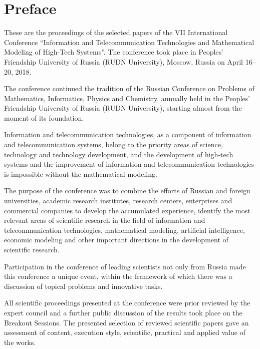 \chapter*{Preface}

These are the proceedings of the selected papers of the VII International
Conference ``Information and
Telecommunication Technologies and Mathematical Modeling of High-Tech
Systems''. 
The conference took
place in Peoples' Friendship University of Russia (RUDN University),
Moscow, Russia on April 16--20, 2018.

The conference continued the tradition of the Russian Conference on
Problems of Mathematics, Informatics, Physics and Chemistry, annually
held in the Peoples' Friendship University of Russia (RUDN
University), starting almost from the moment of its foundation.

Information and telecommunication technologies, as a component of
information and telecommunication systems, belong to the priority
areas of science, technology and technology development, 
and the development of high-tech systems and the
improvement of information and telecommunication technologies is
impossible without the mathematical modeling.

The purpose of the conference was to combine the efforts of Russian and
foreign universities, academic research institutes, research centers,
enterprises and commercial companies to develop the accumulated
experience, identify the most relevant areas of scientific research in
the field of information and telecommunication technologies,
mathematical modeling, artificial intelligence, economic modeling and
other important directions in the development of scientific research.

Participation in the conference of leading scientists not only  from Russia
made this conference a unique event, within
the framework of which there was a discussion of topical problems and
innovative tasks.

All scientific proceedings presented at the conference were prior
reviewed by the expert council and a further public discussion of the
results took place on the Breakout Sessions.  The presented 
selection of reviewed scientific
papers gave an assessment of content, execution style, scientific,
practical and applied value of the works.

\clearpage

